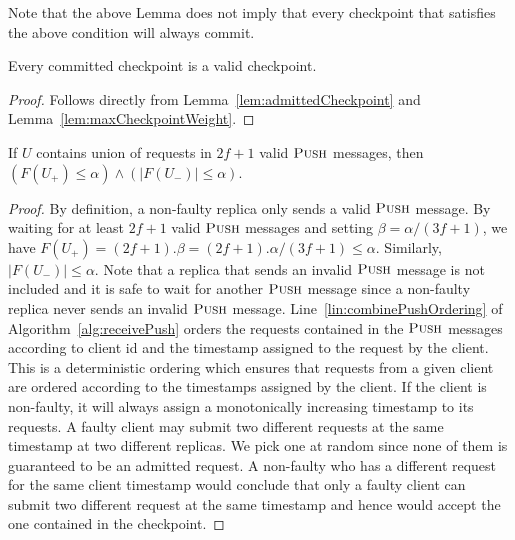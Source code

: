 \documentclass[twocolumn,10pt]{article}
\begin{document}
{Note that the above Lemma does not imply that every checkpoint that satisfies
the above condition will always commit.

\begin{lemma}
\label{lem:validCheckpoint}
Every committed checkpoint is a valid checkpoint.
\end{lemma}
\begin{proof}
Follows directly from Lemma~\ref{lem:admittedCheckpoint} and 
Lemma~\ref{lem:maxCheckpointWeight}.
\end{proof}
\fi


\begin{lemma}
\label{lem:validPush}
If $U$ contains union of requests in $2f+1$ valid $\textsc{Push}$ messages, then
$(F(U_+) \leq \alpha) \wedge (|F(U_-)| \leq \alpha)$.
\end{lemma}
\begin{proof}
By definition, a non-faulty replica only sends a valid $\textsc{Push}$ message. By 
waiting for at least $2f+1$ valid $\textsc{Push}$ messages and setting 
$\beta =\alpha/(3f+1)$, we have 
$F(U_+) = (2f+1).\beta = (2f+1).\alpha/(3f+1) \leq \alpha$. Similarly, $|F(U_-)| \leq \alpha$. Note 
that a replica that sends an invalid $\textsc{Push}$ message is not included and it 
is safe to wait for another $\textsc{Push}$ message since a non-faulty replica never
sends an invalid $\textsc{Push}$ message.
Line~\ref{lin:combinePushOrdering} of Algorithm~\ref{alg:receivePush} orders the
requests contained in the $\textsc{Push}$ messages according to client id and the
timestamp assigned to the request by the client. This is a deterministic ordering
which ensures that requests from a given client are ordered according to the
timestamps assigned by the client. If the client is non-faulty, it will always
assign a monotonically increasing timestamp to its requests. A faulty client may
submit two different requests at the same timestamp at two different replicas. 
We pick one at random since none of them is guaranteed to be an admitted request.
A non-faulty who has a different request  for the same client timestamp would 
conclude that only a faulty client can submit two different request at the same
timestamp and hence would accept the one contained in the checkpoint.
\fi
\end{proof}


}
\end{document}
